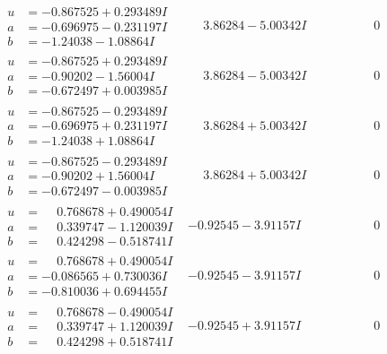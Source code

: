 \documentclass[1p]{elsarticle_modified}
\theoremstyle{definition}
\begin{document}
$$\begin{array}{c|c|c}
\begin{aligned}
u &= -0.867525 + 0.293489 I \\
a &= -0.696975 - 0.231197 I \\
b &= -1.24038 - 1.08864 I\end{aligned}
 & \phantom{-}3.86284 - 5.00342 I & \phantom{-0.000000 } 0 \\ \hline\begin{aligned}
u &= -0.867525 + 0.293489 I \\
a &= -0.90202 - 1.56004 I \\
b &= -0.672497 + 0.003985 I\end{aligned}
 & \phantom{-}3.86284 - 5.00342 I & \phantom{-0.000000 } 0 \\ \hline\begin{aligned}
u &= -0.867525 - 0.293489 I \\
a &= -0.696975 + 0.231197 I \\
b &= -1.24038 + 1.08864 I\end{aligned}
 & \phantom{-}3.86284 + 5.00342 I & \phantom{-0.000000 } 0 \\ \hline\begin{aligned}
u &= -0.867525 - 0.293489 I \\
a &= -0.90202 + 1.56004 I \\
b &= -0.672497 - 0.003985 I\end{aligned}
 & \phantom{-}3.86284 + 5.00342 I & \phantom{-0.000000 } 0 \\ \hline\begin{aligned}
u &= \phantom{-}0.768678 + 0.490054 I \\
a &= \phantom{-}0.339747 - 1.120039 I \\
b &= \phantom{-}0.424298 - 0.518741 I\end{aligned}
 & -0.92545 - 3.91157 I & \phantom{-0.000000 } 0 \\ \hline\begin{aligned}
u &= \phantom{-}0.768678 + 0.490054 I \\
a &= -0.086565 + 0.730036 I \\
b &= -0.810036 + 0.694455 I\end{aligned}
 & -0.92545 - 3.91157 I & \phantom{-0.000000 } 0 \\ \hline\begin{aligned}
u &= \phantom{-}0.768678 - 0.490054 I \\
a &= \phantom{-}0.339747 + 1.120039 I \\
b &= \phantom{-}0.424298 + 0.518741 I\end{aligned}
 & -0.92545 + 3.91157 I & \phantom{-0.000000 } 0 \\ \hline\begin{aligned}

\end{aligned}
\end{array}$$
\end{document}
